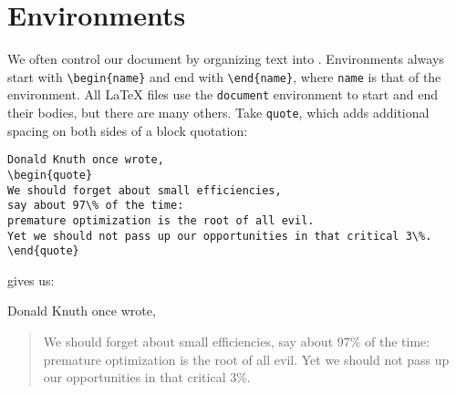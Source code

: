 \section{Environments}

We often control our document by organizing text into .
Environments always start with \verb|\begin{name}| and end with \verb|\end{name}|,
where \texttt{name} is that of the environment.
All \LaTeX{} files use the \texttt{document} environment to start and end their
bodies, but there are many others.
Take \texttt{quote}, which adds additional spacing on both sides of a block
quotation:
\begin{leftfigure}
\begin{lstlisting}
Donald Knuth once wrote,
\begin{quote}
We should forget about small efficiencies,
say about 97\% of the time:
premature optimization is the root of all evil.
Yet we should not pass up our opportunities in that critical 3\%.
\end{quote}
\end{lstlisting}
\end{leftfigure}
gives us:
\begin{leftfigure}
\lm
Donald Knuth once wrote,
\begin{quote}
We should forget about small efficiencies,
say about 97\% of the time:
premature optimization is the root of all evil.
Yet we should not pass up our opportunities in that critical 3\%.
\end{quote}
\end{leftfigure}


